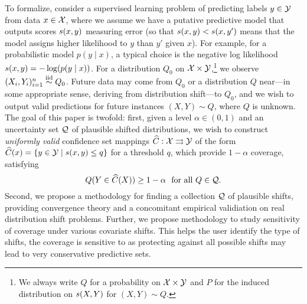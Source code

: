 To formalize, consider a supervised learning problem of predicting
labels $y \in \mathcal{Y}$ from data $x \in \mathcal{X}$, where we assume we have a
putative predictive model that outputs scores $s(x, y)$ measuring
error (so that $s(x, y) < s(x, y')$ means that the
model assigns higher likelihood to $y$ than $y'$ given $x$). For example,
for a probabilistic model $p(y \mid x)$, a typical choice is the negative
log likelihood $s(x, y) = -\log(p(y \mid x))$. For a distribution $Q_0$
on $\mathcal{X} \times \mathcal{Y}$,\footnote{We always write
  $Q$ for a probability on $\mathcal{X} \times \mathcal{Y}$ and $P$ for the induced
  distribution on $s(X, Y)$ for $(X, Y) \sim Q$.}  we observe $(X_i,
Y_i)_{i = 1}^n \stackrel{\rm iid}{\sim} Q_0$. Future data may come from $Q_0$ or a
distribution $Q$ near---in some appropriate sense, deriving from distribution
shift---to $Q_0$, and we wish to
output valid predictions for future instances $(X, Y) \sim Q$, where $Q$ is
unknown.
The goal of this paper is twofold: first, given a level $\alpha
\in (0, 1)$ and an uncertainty set
$\mathcal{Q}$ of plausible shifted distributions, we wish to construct
\emph{uniformly valid} confidence set mappings
$\widehat{C} : \mathcal{X} \rightrightarrows \mathcal{Y}$ of the form
$\widehat{C}(x) = \{y \in \mathcal{Y} \mid s(x, y) \le q\}$ for
a threshold $q$, which provide $1 - \alpha$ coverage, satisfying
\begin{equation}
  \label{eqn:uniform-coverage}
  Q(Y \in \widehat{C}(X)) \ge 1 - \alpha
  ~~ \mbox{for~all~} Q \in \mathcal{Q}.
\end{equation}
Second, we propose a methodology for finding a collection $\mathcal{Q}$ of
plausible shifts, providing convergence theory and a
concomitant empirical validiation on real distribution shift problems. Further, we propose methodology to study sensitivity of coverage under various covariate shifts. This helps the user identify the type of shifts, the coverage is sensitive to as protecting against all possible shifts may lead to very conservative predictive sets.


